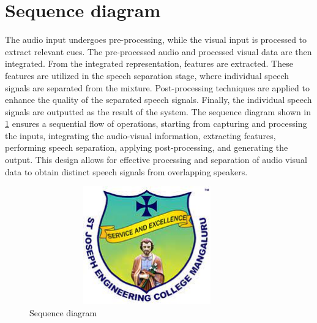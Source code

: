 \documentclass[12pt,a4paper]{report}
\begin{document}
\section{Sequence diagram}
\par
The audio input undergoes pre-processing, while the visual input is processed to extract relevant cues. The pre-processed audio and processed visual data are then integrated. From the integrated representation, features are extracted. These features are utilized in the speech separation stage, where individual speech signals are separated from the mixture. Post-processing techniques are applied to enhance the quality of the separated speech signals. Finally, the individual speech signals are outputted as the result of the system. The sequence diagram shown in \ref{fig:3} ensures a sequential flow of operations, starting from capturing and processing the inputs, integrating the audio-visual information, extracting features, performing speech separation, applying post-processing, and generating the output. This design allows for effective processing and separation of audio visual data to obtain distinct speech signals from overlapping speakers.
\\
\begin{figure}[hbtp]
\centering
\includegraphics[width=4in,height=2in]{./pic/sjeclogo.png}
\caption{Sequence diagram}
\label{fig:3}
\end{figure}



\newpage
\end{document}
